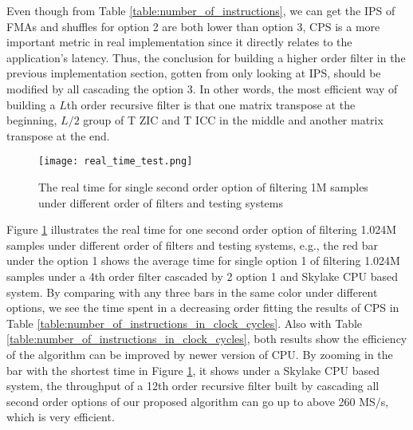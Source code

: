Even though from Table \ref{table:number_of_instructions}, we can get the IPS of FMAs and shuffles for option 2 are both lower than
option 3, CPS is a more important metric in real implementation since it directly relates to the application's latency.
Thus, the conclusion for building a higher order filter in the previous implementation section, gotten from only looking at IPS,
should be modified by all cascading the option 3. In other words, 
the most efficient way of building 
a $L$th order recursive filter is that one matrix transpose at the beginning, $L/2$ group of T ZIC and T ICC in the middle and another matrix transpose at the end.

\begin{figure}[t]
    \centerline{\texttt{[image: real\_time\_test.png]}}
    \caption{The real time for single second order option of filtering 1M samples under different order of filters and testing systems}
    \label{fig:Real_time_test}
  \end{figure}

Figure \ref{fig:Real_time_test} illustrates the real time for one second order option
of filtering 1.024M samples under different order of filters and testing systems, e.g., 
the red bar under the option 1 shows the average time for single option 1
of filtering 1.024M samples under a 4th order filter cascaded by 2 option 1 and Skylake CPU based system.
By comparing with any three bars in the same color under different options, 
we see the time spent in a decreasing order fitting the results of CPS in Table \ref{table:number_of_instructions_in_clock_cycles}. 
Also with Table \ref{table:number_of_instructions_in_clock_cycles}, 
both results show the efficiency of the algorithm
can be improved by newer version of CPU.
By zooming in the bar with the shortest time in Figure \ref{fig:Real_time_test},
it shows under a Skylake CPU based system, the throughput of a 12th order recursive filter built by
cascading all second order options of our proposed algorithm can go up to above 260 MS$\slash$s, which is very efficient.



